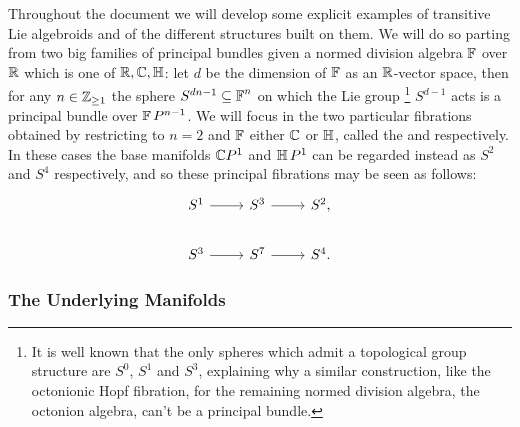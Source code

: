 Throughout the document we will develop some explicit examples of transitive Lie algebroids and of the different structures built on them.  We will do so parting from two big families of principal bundles given a normed division algebra $\operatorname{\mathbb{F}}$ over $\mathbb{R}$ which is one of $\mathbb{R}, \mathbb{C}, \operatorname{\mathbb{H}}$: let $d$ be the dimension of $\operatorname{\mathbb{F}}$ as an $\mathbb{R}$-vector space, then for any $n \in \mathbb{Z}_{\geq 1}$ the sphere $S^{dn - 1} \subseteq \operatorname{\mathbb{F}}^n$ on which the Lie group
\footnote{It is well known that the only spheres which admit a topological group structure are $S^0$, $S^1$ and $S^3$, explaining why a similar construction, like the octonionic Hopf fibration, for the remaining normed division algebra, the octonion algebra, can't be a principal bundle.} 
$S^{d-1}$ acts is a principal bundle over $\operatorname{\mathbb{F}} P^{n-1}$. We will focus in the two particular fibrations obtained by restricting to $n = 2$ and $\operatorname{\mathbb{F}}$ either $\mathbb{C}$ or $\operatorname{\mathbb{H}}$, called the  and  respectively. In these cases the base manifolds $\mathbb{C} P^1$ and $\operatorname{\mathbb{H}} P^1$ can be regarded instead as $S^2$ and $S^4$ respectively, and so these principal fibrations may be seen as follows:
\begin{equation*}
    \begin{tikzcd}
    S^1 \arrow{r} & S^3 \arrow{r} & S^2,\\
    S^3 \arrow{r} & S^7 \arrow{r} & S^4.
    \end{tikzcd}
\end{equation*}


\subsubsection{The Underlying Manifolds}

